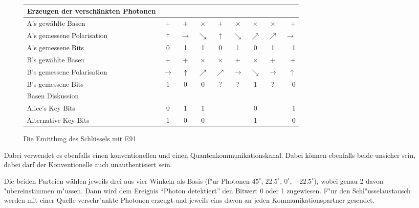   \begin{figure}
  \centering
    \begin{tabular}{ l || c | c | c | c | c | c | c | r }
      \hline
      Erzeugen der versch\"ankten Photonen \\
      \hline
      A's gew\"ahlte Basen & $+$ & $+$ & $\times $ & $+$ & $\times $ & $\times $ & $\times $ & $+$ \\
      \hline
      A's gemessene Polarisation & $\uparrow$ & $\rightarrow$ & $\searrow$ & $\uparrow$ & $\searrow$ &     $\nearrow$ & $\nearrow$ & $\rightarrow$ \\
      \hline
      A's gemessene Bits & 0 & 1 & 1 & 0 & 1 & 0 & 1 & 1 \\
      \hline
      B's gew\"ahlte Basen & $+$ & $+$ & $\times $ & $\times $ & $+$ & $\times $ & $+$ & $+$ \\
      \hline
      B's gemessene Polarisation & $\rightarrow$ & $\uparrow$ & $\nearrow$ & $\nearrow$ & $\rightarrow$     & $\searrow$ & $\rightarrow$ & $\uparrow$ \\
      \hline
      B's gemessene Bits & 1 & 0 & 0 & ? & ? & 1 & ? & 0 \\
      \hline
      Basen Diskussion \\
      \hline
      Alice's Key Bits & 0 & 1 & 1 & & & 0 & & 1 \\
      Alternative Key Bits & 1 & 0 & 0 & & & 1 & & 0 \\
      \hline
    \end{tabular}
    \caption{Die Emittlung des Schl\"ussels mit E91 \label{crypto:tangtab}}
  \end{figure}

  Dabei verwendet es ebenfalls einen konventionellen und einen Quantenkommunikationskanal.
  Dabei k\"onnen ebenfalls beide unsicher sein, dabei darf der Konventionelle auch unauthentisiert sein.


  Die beiden Parteien w\"ahlen jeweils drei aus vier Winkeln als Basis (f"ur Photonen $45^{\circ}$, $22.5^{\circ}$, $0^{\circ}$, $-22.5^{\circ}$), wobei genau 2 davon "ubereinstimmen m"ussen.
  Dann wird dem Ereignis ``Photon detektiert'' den Bitwert 0 oder 1 zugewiesen.
  F"ur den Schl"usselaustausch werden mit einer Quelle verschr"ankte Photonen erzeugt und
  jeweils eins davon an jeden Kommunikationspartner gesendet.


 

